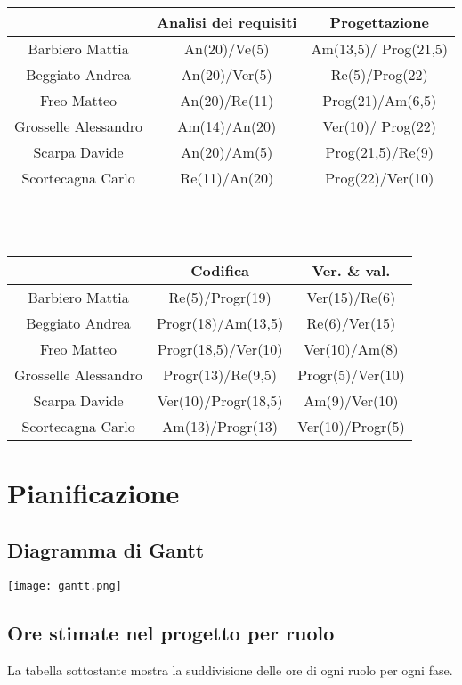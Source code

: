 \documentclass[11pt,a4paper]{article}
\begin{document}
\begin{tabular}{|c|c|c|}
\hline
 & Analisi dei requisiti & Progettazione \\ \hline
Barbiero Mattia & An(20)/Ve(5) & Am(13,5)/ Prog(21,5) \\ \hline
Beggiato Andrea & An(20)/Ver(5) & Re(5)/Prog(22) \\ \hline
Freo Matteo & An(20)/Re(11) & Prog(21)/Am(6,5) \\ \hline
Grosselle Alessandro & Am(14)/An(20) & Ver(10)/ Prog(22) \\ \hline
Scarpa Davide & An(20)/Am(5) & Prog(21,5)/Re(9) \\ \hline
Scortecagna Carlo & Re(11)/An(20) & Prog(22)/Ver(10) \\ \hline
\end{tabular}\\\\

\begin{tabular}{|c|c|c|}
\hline
 & Codifica & Ver. \& val. \\ \hline
Barbiero Mattia & Re(5)/Progr(19) & Ver(15)/Re(6) \\ \hline
Beggiato Andrea & Progr(18)/Am(13,5) & Re(6)/Ver(15) \\ \hline
Freo Matteo & Progr(18,5)/Ver(10) & Ver(10)/Am(8) \\ \hline
Grosselle Alessandro & Progr(13)/Re(9,5) & Progr(5)/Ver(10) \\ \hline
Scarpa Davide & Ver(10)/Progr(18,5) & Am(9)/Ver(10) \\ \hline
Scortecagna Carlo & Am(13)/Progr(13) & Ver(10)/Progr(5) \\ \hline
\end{tabular}


\section{Pianificazione}
\subsection{Diagramma di Gantt}

\texttt{[image: gantt.png]} \\

\subsection{Ore stimate nel progetto per ruolo}
La tabella sottostante mostra la suddivisione delle ore di ogni ruolo per ogni fase.\\
\end{document}
